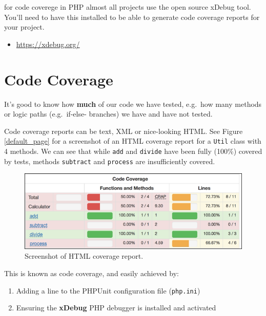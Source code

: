 \documentclass[a4paperpaper,openright]{book}
\providecommand{\tightlist}{%
  \setlength{\itemsep}{0pt}\setlength{\parskip}{0pt}}
\begin{document}
for code coverege in PHP almost all projects use the open source xDebug
tool. You'll need to have this installed to be able to generate code
coverage reports for your project.

\begin{itemize}
\tightlist
\item
  \url{https://xdebug.org/}
\end{itemize}

\hypertarget{code-coverage}{%
\section{Code Coverage}\label{code-coverage}}

It's good to know how \textbf{much} of our code we have tested, e.g.~how
many methods or logic paths (e.g.~if-else- branches) we have and have
not tested.

Code coverage reports can be text, XML or nice-looking HTML. See Figure
\ref{default_page} for a screenshot of an HTML coverage report for a
\texttt{Util} class with 4 methods. We can see that while \texttt{add}
and \texttt{divide} have been fully (100\%) covered by tests, methods
\texttt{subtract} and \texttt{process} are insufficiently covered.

\begin{figure}
\centering
\includegraphics{./tex2pdf.-5a4428120ede4be1/093ea6f2954df63fe293cf27e03e06b550d6c326.png}
\caption{Screenshot of HTML coverage report. \label{coverage_html}}
\end{figure}

This is known as code coverage, and easily achieved by:

\begin{enumerate}
\def\labelenumi{\arabic{enumi}.}
\item
  Adding a line to the PHPUnit configuration file (\texttt{php.ini})
\item
  Ensuring the \textbf{xDebug} PHP debugger is installed and activated
\end{enumerate}
\end{document}
